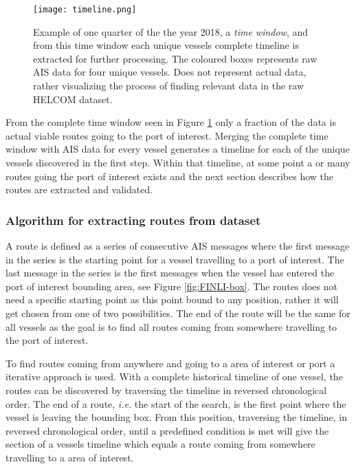 \documentclass[../main.tex]{subfiles}
\begin{document}
\begin{figure}[H]
	\centering
	\texttt{[image: timeline.png]}
	\caption{Example of one quarter of the the year 2018, a \textit{time window}, and from this time window each unique vessels complete timeline is extracted for further processing. The coloured boxes represents raw AIS data for four unique vessels. Does not represent actual data, rather visualizing the process of finding relevant data in the raw HELCOM dataset.}
	\label{fig:timeline}
\end{figure}

From the complete time window seen in Figure \ref{fig:timeline} only a fraction of the data is actual viable routes going to the port of interest. Merging the complete time window with AIS data for every vessel generates a timeline for each of the unique vessels discovered in the first step. Within that timeline, at some point a or many routes going the port of interest exists and the next section describes how the routes are extracted and validated.

\subsubsection{Algorithm for extracting routes from dataset}
\label{sec:algo-section}
A route is defined as a series of consecutive AIS messages where the first message in the series is the starting point for a vessel travelling to a port of interest. The last message in the series is the first messages when the vessel has entered the port of interest bounding area, see Figure \ref{fig:FINLI-box}. The routes does not need a specific starting point as this point bound to any position, rather it will get chosen from one of two possibilities. The end of the route will be the same for all vessels as the goal is to find all routes coming from somewhere travelling to the port of interest.

To find routes coming from anywhere and going to a area of interest or port a iterative approach is used. With a complete historical timeline of one vessel, the routes can be discovered by traversing the timeline in reversed chronological order. The end of a route, \textit{i.e.} the start of the search, is the first point where the vessel is leaving the bounding box. From this position, traversing the timeline, in reversed chronological order, until a predefined condition is met will give the section of a vessels timeline which equals a route coming from somewhere travelling to a area of interest.
\end{document}
